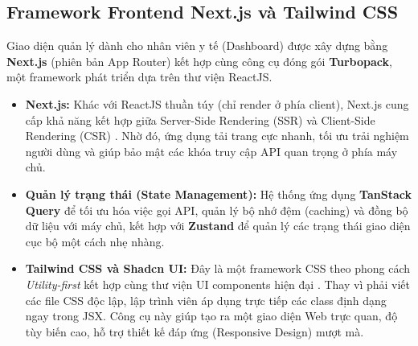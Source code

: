 \documentclass[../DoAn.tex]{subfiles}
\begin{document}

\subsection{Framework Frontend Next.js và Tailwind CSS}
Giao diện quản lý dành cho nhân viên y tế (Dashboard) được xây dựng bằng \textbf{Next.js} (phiên bản App Router) kết hợp cùng công cụ đóng gói \textbf{Turbopack}, một framework phát triển dựa trên thư viện ReactJS.
\begin{itemize}
    \item \textbf{Next.js:} Khác với ReactJS thuần túy (chỉ render ở phía client), Next.js cung cấp khả năng kết hợp giữa Server-Side Rendering (SSR) và Client-Side Rendering (CSR) \cite{vercel2023nextjs}. Nhờ đó, ứng dụng tải trang cực nhanh, tối ưu trải nghiệm người dùng và giúp bảo mật các khóa truy cập API quan trọng ở phía máy chủ.
    \item \textbf{Quản lý trạng thái (State Management):} Hệ thống ứng dụng \textbf{TanStack Query} để tối ưu hóa việc gọi API, quản lý bộ nhớ đệm (caching) và đồng bộ dữ liệu với máy chủ, kết hợp với \textbf{Zustand} để quản lý các trạng thái giao diện cục bộ một cách nhẹ nhàng.
    \item \textbf{Tailwind CSS và Shadcn UI:} Đây là một framework CSS theo phong cách \textit{Utility-first} kết hợp cùng thư viện UI components hiện đại \cite{tailwind2023css}. Thay vì phải viết các file CSS độc lập, lập trình viên áp dụng trực tiếp các class định dạng ngay trong JSX. Công cụ này giúp tạo ra một giao diện Web trực quan, độ tùy biến cao, hỗ trợ thiết kế đáp ứng (Responsive Design) mượt mà.
\end{itemize}

\end{document}
